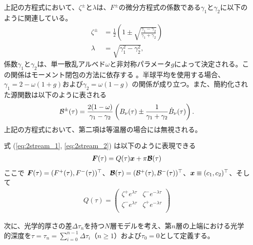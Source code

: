 上記の方程式において、$\zeta^{\pm}$と$\lambda$は、$F^{\pm}$の微分方程式の係数である$\gamma_1$と$\gamma_2$に以下のように関連している。
\begin{align}
    \zeta^\pm &= \frac{1}{2} \left( 1 \pm \sqrt{\frac{\gamma_1 - \gamma_2}{\gamma_1 + \gamma_2}} \right)\\
    \lambda &= \sqrt{\gamma_1^2 - \gamma_2^2},
\end{align}
係数$\gamma_1$と$\gamma_2$は、単一散乱アルベド$\omega$と非対称パラメータ$g$によって決定される。この関係はモーメント閉包の方法に依存する \cite{1989JGR....9416287T}。半球平均を使用する場合、
$\gamma_1 = 2 - \omega (1 + g)$および$\gamma_2 = \omega (1 - g) $
の関係が成り立つ。また、簡約化された源関数は以下のように表される
\begin{align}
\mathcal{B}^\pm (\tau) = 
    \frac{ 2 (1-\omega)}{\gamma_1 - \gamma_2} \left( B_\nu(\tau) \pm \frac{1}{\gamma_1 + \gamma_2} \dot{B}_\nu (\tau) \right).
\end{align}
上記の方程式において、第二項は等温層の場合には無視される。

式 (\ref{eq:2stream_1}, \ref{eq:2stream_2}) は以下のように表現できる
\begin{align}
    \boldsymbol{F}(\tau) = Q(\tau) \boldsymbol{x} + \pi \boldsymbol{\mathcal{B}} (\tau)
\end{align}
ここで $\boldsymbol{F} (\tau) = (F^+ (\tau), F^-(\tau))^\top $、$\boldsymbol{\mathcal{B}} (\tau) = (\mathcal{B}^+ (\tau), \mathcal{B}^- (\tau))^\top$、$\boldsymbol{x} \equiv (c_1, c_2)^\top$、そして
\begin{align}
    Q(\tau) = \left(
\begin{array}{cc}
\zeta^+ e^{\lambda \tau} & \zeta^- e^{-\lambda \tau}  \\
\zeta^- e^{\lambda \tau} & \zeta^+ e^{-\lambda \tau}  \\
\end{array}
\right)
\end{align}

次に、光学的厚さの差$\Delta \tau_n$を持つ$N$層モデルを考え、第$n$層の上端における光学的深度を$\tau = \tau_n = \sum_{i=0}^{n-1} \Delta \tau_i$（$n \ge 1$）および$\tau_0 = 0$として定義する。

